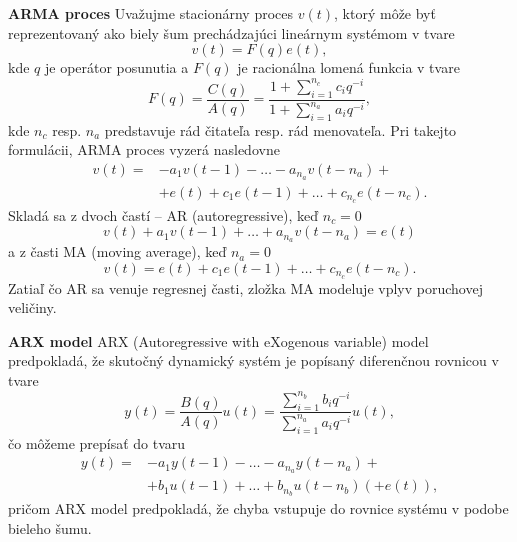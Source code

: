 \textbf{ARMA proces} 
\newline
Uvažujme stacionárny proces $v(t)$, ktorý môže byť reprezentovaný ako biely šum prechádzajúci lineárnym systémom v tvare 
\begin{equation}
	v(t) = F(q)e(t),
\end{equation}
kde $q$ je operátor posunutia a $F(q)$ je racionálna lomená funkcia v tvare 
\begin{equation}
	F(q) = \frac{C(q)}{A(q)} = \frac{1 + \sum_{i=1}^{n_c} c_{i}q^{-i}}{1 + \sum_{i=1}^{n_a} a_{i}q^{-i}},
\end{equation}
kde $n_c$ resp. $n_a$ predstavuje rád čitateľa resp. rád menovateľa. Pri takejto formulácii, ARMA proces vyzerá nasledovne 
\begin{equation}
	\begin{split}
			v(t) = &-a_{1}v(t-1) - \dots -a_{n_a}v(t-n_a) + \\
				   &+e(t) + c_1e(t-1) + \dots + c_{n_c}e(t-n_c).
	\end{split} 
\end{equation}
Skladá sa z dvoch častí -- AR (autoregressive), keď $n_c = 0$
\begin{equation}
	v(t) + a_{1}v(t-1) + \dots + a_{n_a}v(t-n_a) = e(t)
\end{equation}
a z časti MA (moving average), keď $n_a = 0$
\begin{equation}
	v(t) = e(t) + c_1e(t-1) + \dots + c_{n_c}e(t-n_c).
\end{equation}
Zatiaľ čo AR sa venuje regresnej časti, zložka MA modeluje vplyv poruchovej veličiny.
 
\textbf{ARX model}
\newline
 ARX (Autoregressive with eXogenous variable) model predpokladá, že skutočný dynamický systém je popísaný diferenčnou rovnicou v tvare
 \begin{equation}
 	y(t) = \frac{B(q)}{A(q)}u(t) = \frac{\sum_{i=1}^{n_b} b_{i}q^{-i}}{\sum_{i=1}^{n_a} a_{i}q^{-i}}u(t),
 \end{equation}
 čo môžeme prepísať do tvaru 
 \begin{equation}
	 \begin{split}
		 y(t) = &- a_{1}y(t-1) - \dots - a_{n_a}y(t-n_a) + \\
		 		&+ b_{1}u(t-1) + \dots + b_{n_b}u(t-n_b) \left(+ e(t)\right), 
	 \end{split} 
 \end{equation}
 pričom ARX model predpokladá, že chyba vstupuje do rovnice systému v podobe bieleho šumu.
 

